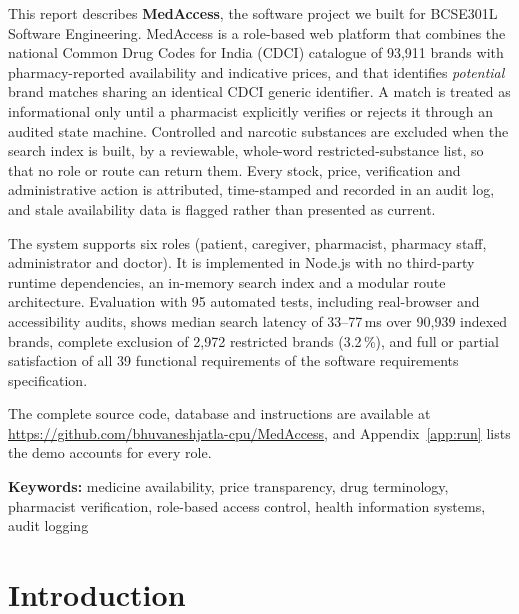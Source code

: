 \documentclass[11pt,a4paper]{article}
\newcommand{\repolink}{\url{https://github.com/bhuvaneshjatla-cpu/MedAccess}}
\begin{document}
This report describes \textbf{MedAccess}, the software project we built for BCSE301L Software Engineering. MedAccess is a role-based web platform that combines the national Common Drug Codes for India (CDCI) catalogue of 93{,}911 brands with pharmacy-reported availability and indicative prices, and that identifies \emph{potential} brand matches sharing an identical CDCI generic identifier. A match is treated as informational only until a pharmacist explicitly verifies or rejects it through an audited state machine. Controlled and narcotic substances are excluded when the search index is built, by a reviewable, whole-word restricted-substance list, so that no role or route can return them. Every stock, price, verification and administrative action is attributed, time-stamped and recorded in an audit log, and stale availability data is flagged rather than presented as current.

The system supports six roles (patient, caregiver, pharmacist, pharmacy staff, administrator and doctor). It is implemented in Node.js with no third-party runtime dependencies, an in-memory search index and a modular route architecture. Evaluation with 95 automated tests, including real-browser and accessibility audits, shows median search latency of 33--77\,ms over 90{,}939 indexed brands, complete exclusion of 2{,}972 restricted brands (3.2\,\%), and full or partial satisfaction of all 39 functional requirements of the software requirements specification.

The complete source code, database and instructions are available at \repolink{}, and Appendix~\ref{app:run} lists the demo accounts for every role.

\vspace{0.5cm}
\noindent\textbf{Keywords:} medicine availability, price transparency, drug terminology, pharmacist verification, role-based access control, health information systems, audit logging

\clearpage
\begingroup\footnotesize
\tableofcontents
\endgroup

\clearpage

\section{Introduction}\label{ch:intro}
\end{document}
